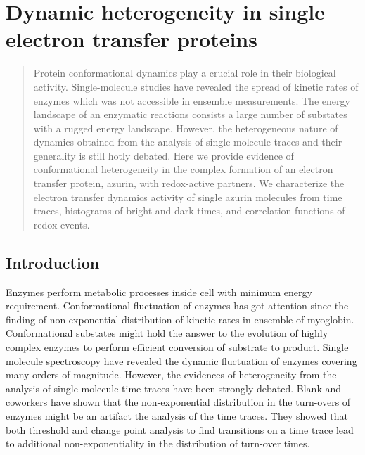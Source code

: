 \chapter{Dynamic heterogeneity in single electron transfer proteins}
\label{chapter:azurin}
\graphicspath{{./chapters/c4_azurin_sm/main/}}
\begin{abstract}
	Protein conformational dynamics play a crucial role in their biological activity. Single-molecule studies have revealed the spread of kinetic rates of enzymes which was not accessible in ensemble measurements.
	The energy landscape of an enzymatic reactions consists a large number of substates with a rugged energy landscape.
	However, the heterogeneous nature of dynamics obtained from the analysis of single-molecule traces and their generality is still hotly debated. Here we provide evidence of conformational heterogeneity in the complex formation of an electron transfer protein, azurin, with redox-active partners. We characterize the electron transfer dynamics activity of single azurin molecules from time traces, histograms of bright and dark times, and correlation functions of redox events. 
\end{abstract}
\newpage
\section{Introduction}
Enzymes perform metabolic processes inside cell with minimum energy requirement. Conformational fluctuation of enzymes has got attention since the finding of non-exponential distribution of kinetic rates in ensemble of myoglobin. \cite{frauenfelder1991the,ansari1985protein,stein1985a,henzler-wildman2007dynamic} Conformational substates might hold the answer to the evolution of highly complex enzymes to perform efficient conversion of substrate to product. Single molecule spectroscopy have revealed the dynamic fluctuation of enzymes covering many orders of magnitude.\cite{lu1998single-molecule,yang2003protein,english2006ever-fluctuating}
However, the evidences of heterogeneity from the analysis of single-molecule time traces have been strongly debated. Blank and coworkers have shown that the non-exponential distribution in the turn-overs of enzymes might be an artifact the analysis of the time traces.\cite{terentyeva2012dynamic} They showed that both threshold and change point analysis to find transitions on a time trace lead to additional non-exponentiality in the distribution of turn-over times.


